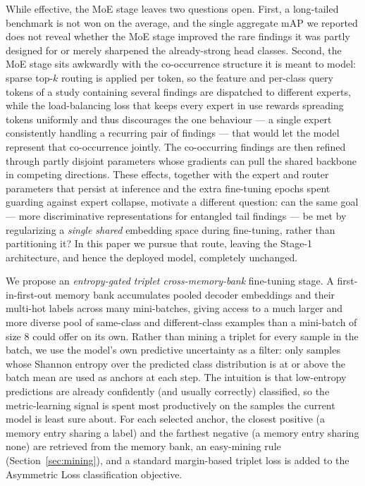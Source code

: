 \documentclass[conference]{IEEEtran}
\begin{document}
While effective, the MoE stage leaves two questions open. First, a long-tailed benchmark is not won on the average, and the single aggregate mAP we reported does not reveal whether the MoE stage improved the rare findings it was partly designed for or merely sharpened the already-strong head classes. Second, the MoE stage sits awkwardly with the co-occurrence structure it is meant to model: sparse top-$k$ routing is applied per token, so the feature and per-class query tokens of a study containing several findings are dispatched to different experts, while the load-balancing loss that keeps every expert in use rewards spreading tokens uniformly and thus discourages the one behaviour --- a single expert consistently handling a recurring pair of findings --- that would let the model represent that co-occurrence jointly. The co-occurring findings are then refined through partly disjoint parameters whose gradients can pull the shared backbone in competing directions. These effects, together with the expert and router parameters that persist at inference and the extra fine-tuning epochs spent guarding against expert collapse, motivate a different question: can the same goal --- more discriminative representations for entangled tail findings --- be met by regularizing a \emph{single shared} embedding space during fine-tuning, rather than partitioning it? In this paper we pursue that route, leaving the Stage-1 architecture, and hence the deployed model, completely unchanged.

We propose an \emph{entropy-gated triplet cross-memory-bank} fine-tuning stage. A first-in-first-out memory bank accumulates pooled decoder embeddings and their multi-hot labels across many mini-batches, giving access to a much larger and more diverse pool of same-class and different-class examples than a mini-batch of size 8 could offer on its own. Rather than mining a triplet for every sample in the batch, we use the model's own predictive uncertainty as a filter: only samples whose Shannon entropy over the predicted class distribution is at or above the batch mean are used as anchors at each step. The intuition is that low-entropy predictions are already confidently (and usually correctly) classified, so the metric-learning signal is spent most productively on the samples the current model is least sure about. For each selected anchor, the closest positive (a memory entry sharing a label) and the farthest negative (a memory entry sharing none) are retrieved from the memory bank, an easy-mining rule (Section~\ref{sec:mining}), and a standard margin-based triplet loss is added to the Asymmetric Loss classification objective.
\end{document}
